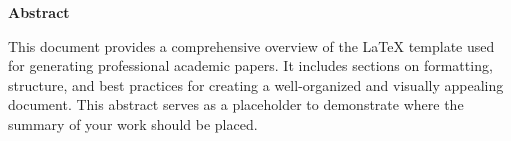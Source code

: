 \thispagestyle{plain}
\newpage

\begin{center}
  \textbf{Abstract}
\end{center}

\vspace{1cm} %

This document provides a comprehensive overview of the LaTeX template used for generating professional academic papers. It includes sections on formatting, structure, and best practices for creating a well-organized and visually appealing document. This abstract serves as a placeholder to demonstrate where the summary of your work should be placed.

\vfill

\pagebreak
